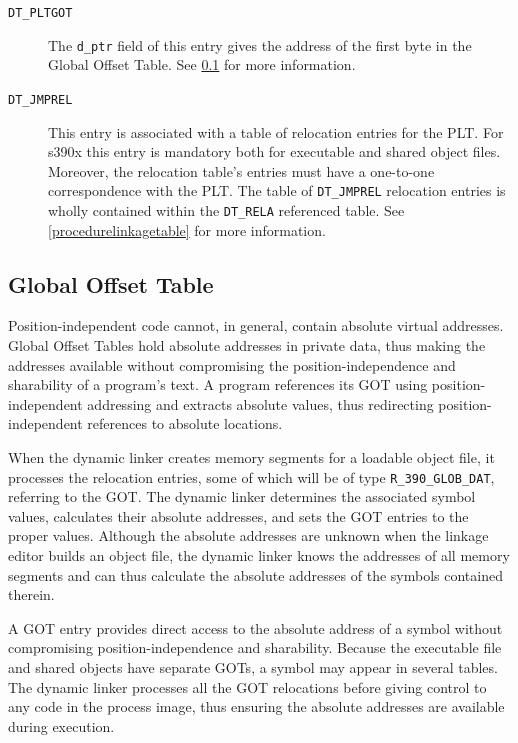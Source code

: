 \documentclass[USenglish,fontsize=11pt,twoside,%
  toc=bib,toc=idx,toc=graduated,numbers=noendperiod,
  bookmarks=true,
  bookmarksnumbered=true,
  bookmarksopen=true,
  bookmarksopenlevel=1,
  breaklinks=true,
  colorlinks=true,
  linkcolor=black,
  pdfpagelayout={TwoPageRight},
  pdfusetitle=true
]{scrreprt}
\newcommand{\ABINAME}{s390x}
\newcommand{\ABINAME}{s390}
\begin{document}
\begin{description}
\item[\texttt{DT\_PLTGOT}] The \texttt{d\_ptr} field of this entry gives
  the address of the first byte in the Global Offset Table.  See
  \cref{globaloffsettable} for more information.

\item[\texttt{DT\_JMPREL}] This entry is associated with a table of
  relocation entries for the PLT\@.  For \ABINAME{} this entry is
  mandatory both for executable and shared object files.  Moreover,
  the relocation table's entries must have a one-to-one correspondence
  with the PLT\@.  The table of \texttt{DT\_JMPREL} relocation entries
  is wholly contained within the \texttt{DT\_RELA} referenced table.
  See \cref{procedurelinkagetable} for more information.
\end{description}

\subsection{Global Offset Table}
\label{globaloffsettable}
Position-independent code cannot, in general, contain absolute virtual
addresses.  Global Offset Tables hold absolute addresses in private
data, thus making the addresses available without compromising the
position-independence and sharability of a program's text.  A program
references its GOT using position-independent addressing and extracts
absolute values, thus redirecting position-independent references to
absolute locations.

When the dynamic linker creates memory segments for a loadable object
file, it processes the relocation entries, some of which will be of
type \texttt{R\_390\_GLOB\_DAT}, referring to the GOT\@.  The dynamic
linker determines the associated symbol values, calculates their
absolute addresses, and sets the GOT entries to the proper
values.  Although the absolute addresses are unknown when the linkage
editor builds an object file, the dynamic linker knows the addresses
of all memory segments and can thus calculate the absolute addresses
of the symbols contained therein.

A GOT entry provides direct access to the absolute address of a symbol
without compromising position-independence and sharability.  Because
the executable file and shared objects have separate GOTs, a symbol
may appear in several tables.  The dynamic linker processes all the
GOT relocations before giving control to any code in the process
image, thus ensuring the absolute addresses are available during
execution.
\end{document}
